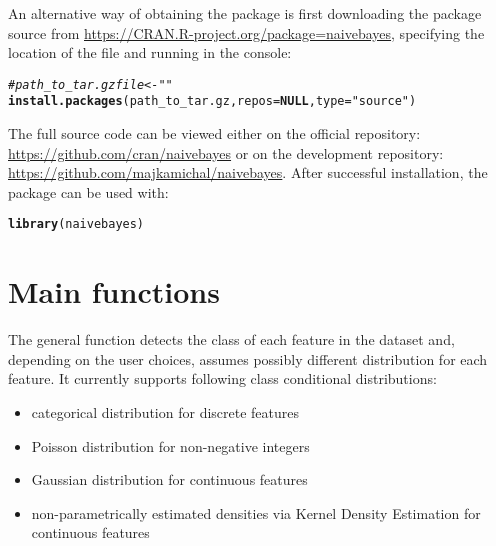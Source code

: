 \documentclass{article}\usepackage[]{graphicx}\usepackage[]{color}
\makeatletter
\newcommand{\hlstr}[1]{\textcolor[rgb]{0.192,0.494,0.8}{#1}}%
\newcommand{\hlcom}[1]{\textcolor[rgb]{0.678,0.584,0.686}{\textit{#1}}}%
\newcommand{\hlstd}[1]{\textcolor[rgb]{0.345,0.345,0.345}{#1}}%
\newcommand{\hlkwa}[1]{\textcolor[rgb]{0.161,0.373,0.58}{\textbf{#1}}}%
\newcommand{\hlkwc}[1]{\textcolor[rgb]{0.333,0.667,0.333}{#1}}%
\newcommand{\hlkwd}[1]{\textcolor[rgb]{0.737,0.353,0.396}{\textbf{#1}}}%
\newenvironment{kframe}{%
 \def\at@end@of@kframe{}%
 \ifinner\ifhmode%
  \def\at@end@of@kframe{\end{minipage}}%
  \begin{minipage}{\columnwidth}%
 \fi\fi%
 \def\FrameCommand##1{\hskip\@totalleftmargin \hskip-\fboxsep
 \colorbox{shadecolor}{##1}\hskip-\fboxsep
     \hskip-\linewidth \hskip-\@totalleftmargin \hskip\columnwidth}%
 \MakeFramed {\advance\hsize-\width
   \@totalleftmargin\z@ \linewidth\hsize
   \@setminipage}}%
 {\par\unskip\endMakeFramed%
 \at@end@of@kframe}
\newenvironment{knitrout}{}{} %
\makeatother
\begin{document}
An alternative way of obtaining the package is first downloading the package source from \url{https://CRAN.R-project.org/package=naivebayes}, specifying the location of the file and running in the console:

\begin{knitrout}
\color{fgcolor}\begin{kframe}
\begin{alltt}
\hlcom{# path_to_tar.gz file <- " "}
\hlkwd{install.packages}\hlstd{(path_to_tar.gz,} \hlkwc{repos} \hlstd{=} \hlkwa{NULL}\hlstd{,} \hlkwc{type} \hlstd{=} \hlstr{"source"}\hlstd{)}
\end{alltt}
\end{kframe}
\end{knitrout}

The full source code can be viewed either on the official \textcolor{darkgreen}{{}} \textcolor{darkgreen}{{}} repository: \url{https://github.com/cran/naivebayes} or on the development repository: \url{https://github.com/majkamichal/naivebayes}. After successful installation, the package can be used with:

\begin{knitrout}
\color{fgcolor}\begin{kframe}
\begin{alltt}
\hlkwd{library}\hlstd{(naivebayes)}
\end{alltt}
\end{kframe}
\end{knitrout}


\section{Main functions}

The general function \textcolor{darkgreen}{{}} detects the class of each feature in the dataset and, depending on the user choices, assumes possibly different distribution for each feature. It currently supports following class conditional distributions:

\begin{itemize}
  \item categorical distribution for discrete features
  \item Poisson distribution for non-negative integers
  \item Gaussian distribution for continuous features
  \item non-parametrically estimated densities via Kernel Density Estimation for continuous features
\end{itemize}
\end{document}
